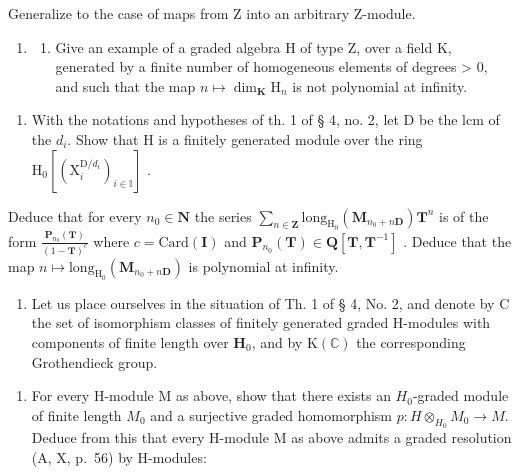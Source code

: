 Generalize to the case of maps from Z into an arbitrary Z-module.

\begin{enumerate}
\def\labelenumi{\arabic{enumi})}
\setcounter{enumi}{2}
\tightlist
\item
  \begin{enumerate}
  \def\labelenumii{\alph{enumii})}
  \tightlist
  \item
    Give an example of a graded algebra H of type Z, over a field K, generated by a finite number of homogeneous elements of degrees \textgreater{} 0, and such that the map \(n \mapsto \dim_{\mathbf{K}} \mathrm{H}_{n}\) is not polynomial at infinity.
  \end{enumerate}
\end{enumerate}

\begin{enumerate}
\def\labelenumi{\alph{enumi})}
\setcounter{enumi}{1}
\tightlist
\item
  With the notations and hypotheses of th. 1 of § 4, no. 2, let D be the lcm of the \(d_{i}\). Show that H is a finitely generated module over the ring \(\mathrm{H}_{0}[(\mathrm{X}_{i}^{\mathrm{D}/d_{i}})_{i\in\mathbb{I}}]\) .
\end{enumerate}

Deduce that for every \(n_{0}\in\mathbf{N}\) the series \(\sum_{n\in\mathbf{Z}}\mathrm{long}_{\mathrm{H}_{0}}(\mathbf{M}_{n_{0}+n\mathbf{D}})\mathbf{T}^{n}\) is of the form \(\frac{\mathbf{P}_{n_{0}}(\mathbf{T})}{(1-\mathbf{T})^{c}}\) where \(c=\mathrm{Card}(\mathbf{I})\) and \(\mathbf{P}_{n_{0}}(\mathbf{T})\in\mathbf{Q}[\mathbf{T},\mathbf{T}^{-1}]\) . Deduce that the map \(n\mapsto\mathrm{long}_{\mathrm{H}_{0}}(\mathbf{M}_{n_{0}+n\mathbf{D}})\) is polynomial at infinity.

\begin{enumerate}
\def\labelenumi{\arabic{enumi})}
\setcounter{enumi}{3}
\tightlist
\item
  Let us place ourselves in the situation of Th. 1 of § 4, No. 2, and denote by C the set of isomorphism classes of finitely generated graded H-modules with components of finite length over \(\mathbf{H}_0\), and by \(\mathrm{K}(\mathbb{C})\) the corresponding Grothendieck group.
\end{enumerate}

\begin{enumerate}
\def\labelenumi{\alph{enumi})}
\tightlist
\item
  For every H-module M as above, show that there exists an \(H_{0}\)-graded module of finite length \(M_{0}\) and a surjective graded homomorphism \(p:H\otimes_{H_{0}}M_{0}\to M\). Deduce from this that every H-module M as above admits a graded resolution (A, X, p.~56) by H-modules:
\end{enumerate}

